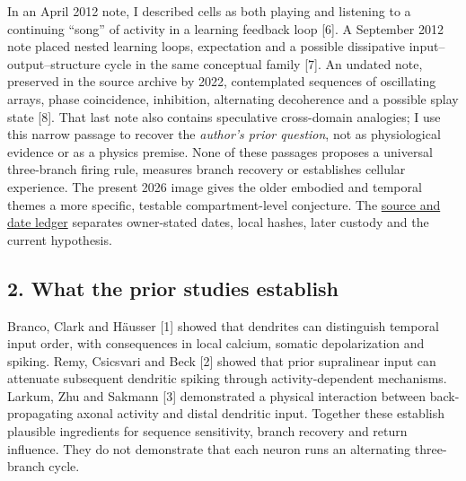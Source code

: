 \documentclass[
  american,
  11pt,
  letterpaper,
]{article}
\begin{document}
In an April 2012 note, I described cells as both playing and listening to a continuing ``song'' of activity in a learning feedback loop {[}6{]}. A September 2012 note placed nested learning loops, expectation and a possible dissipative input--output--structure cycle in the same conceptual family {[}7{]}. An undated note, preserved in the source archive by 2022, contemplated sequences of oscillating arrays, phase coincidence, inhibition, alternating decoherence and a possible splay state {[}8{]}. That last note also contains speculative cross-domain analogies; I use this narrow passage to recover the \emph{author's prior question}, not as physiological evidence or as a physics premise. None of these passages proposes a universal three-branch firing rule, measures branch recovery or establishes cellular experience. The present 2026 image gives the older embodied and temporal themes a more specific, testable compartment-level conjecture. The \href{https://github.com/v5ma/v5ma.github.io/blob/f6d3867df89ae9dea32f763b1d55c84212c41cc6/papers/companions/five-papers-20260923/temporal/paper/SOURCE-AND-NONDUPLICATION.md}{source and date ledger} separates owner-stated dates, local hashes, later custody and the current hypothesis.

\subsection{2. What the prior studies establish}\label{what-the-prior-studies-establish}

Branco, Clark and Häusser {[}1{]} showed that dendrites can distinguish temporal input order, with consequences in local calcium, somatic depolarization and spiking. Remy, Csicsvari and Beck {[}2{]} showed that prior supralinear input can attenuate subsequent dendritic spiking through activity-dependent mechanisms. Larkum, Zhu and Sakmann {[}3{]} demonstrated a physical interaction between back-propagating axonal activity and distal dendritic input. Together these establish plausible ingredients for sequence sensitivity, branch recovery and return influence. They do not demonstrate that each neuron runs an alternating three-branch cycle.
\end{document}
